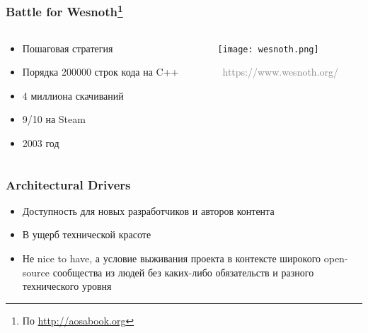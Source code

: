 \documentclass[xetex,mathserif,serif]{beamer}
\newcommand{\attribution}[1] {
	\vspace{-5mm}\begin{flushright}\begin{scriptsize}\textcolor{gray}{\textcopyright\, #1}\end{scriptsize}\end{flushright}
}
\begin{document}
	\begin{frame}
		\frametitle{Battle for Wesnoth\footnote{\tiny{По \url{http://aosabook.org}}}}
		\begin{columns}
			\begin{column}{0.4\textwidth}
				\begin{itemize}
					\item Пошаговая стратегия
					\item Порядка 200000 строк кода на C++
					\item 4 миллиона скачиваний
					\item 9/10 на Steam
					\item 2003 год
				\end{itemize}
			\end{column}
			\begin{column}{0.6\textwidth}
				\texttt{[image: wesnoth.png]}
				\attribution{https://www.wesnoth.org/}
			\end{column}
		\end{columns}
	\end{frame}

	\begin{frame}
		\frametitle{Architectural Drivers}
		\begin{itemize}
			\item Доступность для новых разработчиков и авторов контента
			\item В ущерб технической красоте
			\item Не nice to have, а условие выживания проекта в контексте широкого open-source сообщества из людей без каких-либо обязательств и разного технического уровня
		\end{itemize}
	\end{frame}
\end{document}

